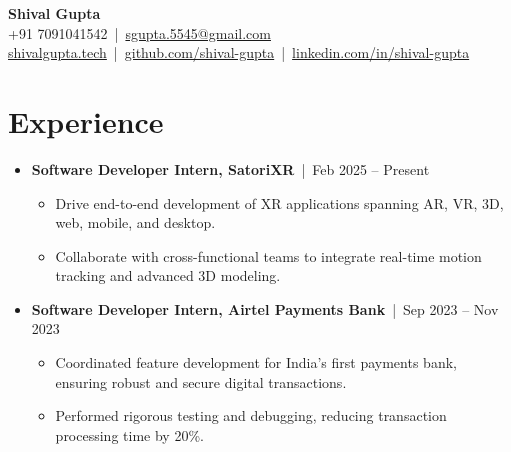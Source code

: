 \documentclass[a4paper,10pt]{article}
\newcommand{\sectionbreak}{\vspace{0.2em}}
\newcommand{\subsectionbreak}{\vspace{0em}}
\begin{document}
\begin{center}
    {\fontsize{24pt}{28pt}\selectfont \textbf{Shival Gupta}} \\
    \vspace{0.2cm}
    \small +91 7091041542 \,|\, \href{mailto:sgupta.5545@gmail.com}{\textcolor{accentcolor}{sgupta.5545@gmail.com}} \\
    \href{https://shivalgupta.tech/}{\textcolor{accentcolor}{shivalgupta.tech}} \,|\, \href{https://github.com/shival-gupta/}{\textcolor{accentcolor}{github.com/shival-gupta}} \,|\, \href{https://linkedin.com/in/shival-gupta/}{\textcolor{accentcolor}{linkedin.com/in/shival-gupta}}
\end{center}

\vspace{-0.3cm}

\section{Experience}
\begin{itemize}[noitemsep, topsep=0pt]
    \item \textbf{Software Developer Intern, SatoriXR} \,|\, Feb 2025 – Present
        \subsectionbreak
        \begin{itemize}
            \item Drive end-to-end development of XR applications spanning AR, VR, 3D, web, mobile, and desktop.
            \item Collaborate with cross-functional teams to integrate real-time motion tracking and advanced 3D modeling.
        \end{itemize}
        \subsectionbreak
    \item \textbf{Software Developer Intern, Airtel Payments Bank} \,|\, Sep 2023 – Nov 2023
        \subsectionbreak
        \begin{itemize}
            \item Coordinated feature development for India’s first payments bank, ensuring robust and secure digital transactions.
            \item Performed rigorous testing and debugging, reducing transaction processing time by 20\%.
        \end{itemize}
\end{itemize}

\sectionbreak

\end{document}
